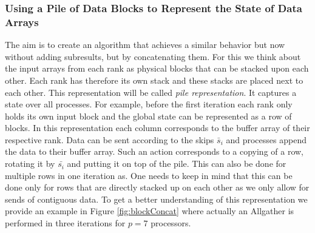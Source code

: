 \subsubsection{Using a Pile of Data Blocks to Represent the State of Data Arrays}
The aim is to create an algorithm that achieves a similar behavior but now without adding  subresults, but by concatenating them. For this we think about the input arrays from each rank as physical blocks that can be stacked upon each other. Each rank has therefore its own stack and these stacks are placed next to each other. This representation will be called \emph{pile representation}. It captures a state over all processes. For example, before the first iteration each rank only holds its own input block and the global state can be represented as a row of blocks. In this representation each column corresponds to the buffer array of their respective rank. Data can be sent according to the skips $\bar{s}_i$ and processes append the data to their buffer array. Such an action corresponds to a copying of a row, rotating it by $\bar{s_i}$ and putting it on top of the pile. This can also be done for multiple rows in one iteration as. One needs to keep in mind that this can be done only for rows that are directly stacked up on each other as we only allow for sends of contiguous data. To get a better understanding of this representation we provide an example in Figure \ref{fig:blockConcat} where actually an Allgather is performed in three iterations for $p=7$ processors.
